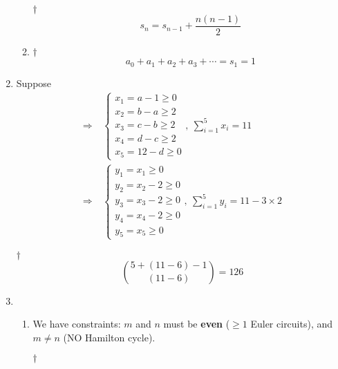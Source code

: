 \documentclass[a4paper,12pt]{article}
\begin{document}
\begin{enumerate}
\begin{enumerate}[label=(\alph*)]
\begin{answer}{$\dag$}
\begin{equation}
                s_n = s_{n - 1} + \frac{n(n - 1)}{2}
            \end{equation}
        \end{answer}
        \item \begin{answer}{$\dag$}\begin{equation}
                a_0 + a_1 + a_2 + a_3 + \cdots = s_1 = 1
            \end{equation}
        \end{answer}
    \end{enumerate}
    \item Suppose \begin{equation}
        \begin{aligned}
            \Rightarrow & \ \begin{cases}
                x_1 = a - 1 \ge 0 \\
                x_2 = b - a \ge 2 \\
                x_3 = c - b \ge 2 \\
                x_4 = d - c \ge 2 \\
                x_5 = 12 - d \ge 0
            \end{cases} , \ \sum_{i = 1}^{5}x_i = 11 \\
            \Rightarrow & \ \begin{cases}
                y_1 = x_1 \ge 0 \\
                y_2 = x_2 - 2 \ge 0 \\
                y_3 = x_3 - 2 \ge 0 \\
                y_4 = x_4 - 2 \ge 0 \\
                y_5 = x_5 \ge 0
            \end{cases} , \ \sum_{i = 1}^{5}y_i = 11 - 3 \times 2
        \end{aligned}
    \end{equation}
    \begin{answer}{$\dag$}\begin{equation}
            \binom{5 + (11 - 6) - 1}{(11 - 6)} = 126
        \end{equation}
    \end{answer}
    \item \begin{enumerate}[label=(\alph*)]
        \item We have constraints: $m$ and $n$ must be \textbf{even} ($\ge 1$ Euler circuits), and $m \neq n$ (NO Hamilton cycle).
        \begin{answer}{$\dag$}\begin{equation}

\end{equation}
\end{answer}
\end{enumerate}
\end{enumerate}
\end{document}
